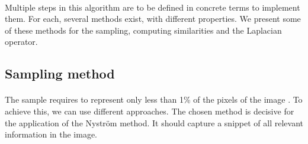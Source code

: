 \paragraph{}
Multiple steps in this algorithm are to be defined in concrete terms to implement them.
For each, several methods exist, with different properties.
We present some of these methods for the sampling, computing similarities and the Laplacian operator.

\subsection{Sampling method}

\paragraph{}
The sample requires to represent only less than 1\% of the pixels of the image \cite{fowlkes_spectral_2004}.
To achieve this, we can use different approaches.
The chosen method is decisive for the application of the Nystr\"om method.
It should capture a snippet of all relevant information in the image.
